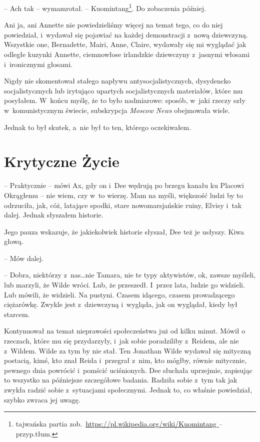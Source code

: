 \documentclass[oneside,polish,11pt,sfheadings]{mwbk}
\begin{document}
-- Ach tak -- wymamrotał. -- Kuomintang\footnote{ tajwańska partia
zob.~\url{https://pl.wikipedia.org/wiki/Kuomintang } -- przyp.tłum.}. Do zobaczenia
później.

Ani ja, ani Annette nie powiedzieliśmy więcej na temat tego, co do niej
powiedział, i~wydawał się pojawiać na każdej demonstracji z~nową
dziewczyną. Wszystkie one, Bernadette, Mairi, Anne, Claire, wydawały się
mi wyglądać jak odległe kuzynki Annette, ciemnowłose irlandzkie
dziewczyny z~jasnymi włosami i~ironicznymi głosami.

Nigdy nie skomentował stałego napływu antysocjalistycznych, dysydencko
socjalistycznych lub irytująco upartych socjalistycznych materiałów,
które mu posyłałem. W~końcu myślę, że to było nadmiarowe: sposób, w~jaki
rzeczy szły w~komunistycznym świecie, subskrypcja \emph{Moscow News}
obejmowała wiele.

Jednak to był skutek, a~nie był to ten, którego oczekiwałem.

\chapter{Krytyczne Życie}

-- Praktycznie -- mówi Ax, gdy on i~Dee wędrują po brzegu kanału ku
Placowi Okrągłemu -- nie wiem, czy w~to wierzę. Mam na myśli, większość
ludzi by to odrzuciła, jak, cóż, latające spodki, stare nowomarsjańskie
ruiny, Elvisy i~tak dalej. Jednak słyszałem historie.

Jego pauza wskazuje, że jakiekolwiek historie słyszał, Dee też je
usłyszy. Kiwa głową.

-- Mów dalej.

-- Dobra, niektórzy z~nas\ldots nie Tamara, nie te typy aktywistów, ok,
zawsze myśleli, lub marzyli, że Wilde wróci. Lub, że przeszedł. I~przez
lata, ludzie go widzieli. Lub mówili, że widzieli. Na pustyni. Czasem
idącego, czasem prowadzącego ciężarówkę. Zwykle jest z~dziewczyną i~wygląda, jak on wyglądał, kiedy był starcem.

Kontynuował na temat nieprawości społeczeństwa już od kilku minut. Mówił
o rzeczach, które mu się przydarzyły, i~jak sobie poradziliby z~Reidem,
ale nie z~Wildem. Wilde za tym by nie stał. Ten Jonathan Wilde wydawał
się mityczną postacią, kimś, kto znał Reida i~przegrał z~nim, kto
mógłby, równie mitycznie, pewnego dnia powrócić i~pomścić uciśnionych.
Dee słuchała uprzejmie, zapisując to wszystko na późniejsze szczegółowe
badania. Radziła sobie z~tym tak jak zwykła radzić sobie z~sytuacjami
społecznymi. Jednak to, co właśnie powiedział, szybko zwraca jej uwagę.
\end{document}
